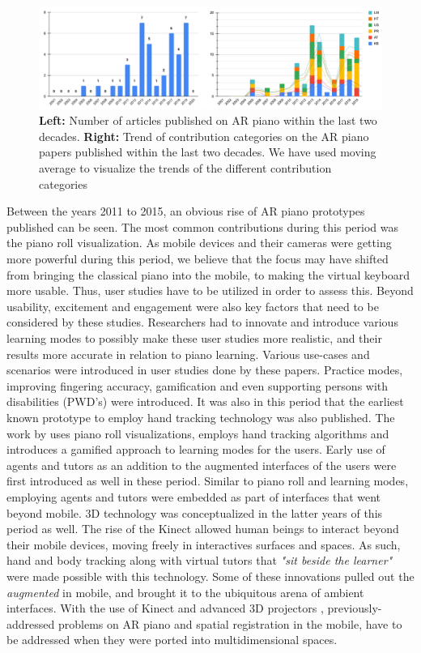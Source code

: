 \documentclass[manuscript,screen]{acmart}
\begin{document}
\begin{figure}
    \centering
    \includegraphics[width=15cm]{figures/doublechart.png}
    \caption{ \textbf{Left:} Number of articles published on AR piano within the last two decades. \textbf{Right:} Trend of contribution categories on the AR piano papers published within the last two decades. We have used moving average to visualize the trends of the different contribution categories }
    \label{fig:doublechart}
\end{figure} 

Between the years 2011 to 2015, an obvious rise of AR piano prototypes published can be seen. The most common contributions during this period was the piano roll visualization. As mobile devices and their cameras were getting more powerful during this period, we believe that the focus may have shifted from bringing the classical piano into the mobile, to making the virtual keyboard more usable. Thus, user studies have to be utilized in order to assess this. Beyond usability, excitement and engagement were also key factors that need to be considered by these studies. Researchers had to innovate and introduce various learning modes to possibly make these user studies more realistic, and their results more accurate in relation to piano learning. Various use-cases and scenarios were introduced in user studies done by these papers. Practice modes, improving fingering accuracy, gamification and even supporting persons with disabilities (PWD's) were introduced. It was also in this period that the earliest known prototype to employ hand tracking \cite{huang2011piano} technology was also published. The work by \citet{weing2013piano} uses piano roll visualizations, employs hand tracking algorithms and introduces a gamified approach to learning modes for the users. Early use of agents and tutors as an addition to the augmented interfaces of the users were first introduced as well in these period. Similar to piano roll and learning modes, employing agents and tutors were embedded as part of interfaces that went beyond mobile. 3D technology was conceptualized in the latter years of this period as well. The rise of the Kinect \cite{zhang2012microsoft} allowed human beings to interact beyond their mobile devices, moving freely in interactives surfaces and spaces. As such, hand and body tracking along with virtual tutors that \textit{"sit beside the learner"} were made possible with this technology. Some of these innovations pulled out the \textit{augmented} in mobile, and brought it to the ubiquitous arena of ambient interfaces. With the use of Kinect and advanced 3D projectors \cite{yang2012augmented}, previously-addressed problems on AR piano and spatial registration in the mobile, have to be addressed when they were ported into multidimensional spaces. 
\end{document}
